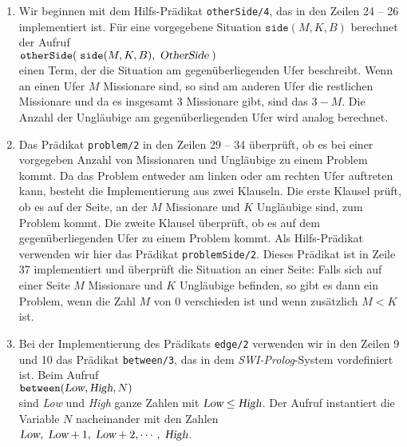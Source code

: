 \begin{enumerate}
\item Wir beginnen mit dem  Hilfs-Pr\"{a}dikat \texttt{otherSide/4}, das in den
      Zeilen 24 -- 26 implementiert ist.  F\"{u}r eine vorgegebene Situation
      $\texttt{side}(M,K,B)$ berechnet der Aufruf \\[0.1cm]
      \hspace*{1.3cm} $\texttt{otherSide}(\; \texttt{side}(M, K, B),\; \textsl{OtherSide} \;)$
      \\[0.1cm] 
      einen Term, der die Situation am gegen\"{u}berliegenden Ufer beschreibt.
      Wenn an einen Ufer $M$ Missionare sind, so sind am anderen Ufer die restlichen
      Missionare und da es insgesamt $3$ Missionare gibt, sind das $3 - M$.
      Die Anzahl der Ungl\"{a}ubige am gegen\"{u}berliegenden Ufer wird analog berechnet. 
\item Das Pr\"{a}dikat \texttt{problem/2} in den Zeilen 29 -- 34 \"{u}berpr\"{u}ft, ob es bei einer vorgegeben
      Anzahl von Missionaren und Ungl\"{a}ubige zu einem Problem kommt.
      Da das Problem entweder am linken oder am rechten Ufer auftreten kann,
      besteht die Implementierung aus zwei Klauseln.  Die erste Klausel pr\"{u}ft,
      ob es auf der Seite, an der $M$ Missionare und $K$ Ungl\"{a}ubige sind, zum Problem
      kommt.  Die zweite Klausel \"{u}berpr\"{u}ft, ob es auf dem gegen\"{u}berliegenden
      Ufer zu einem Problem kommt.  Als Hilfs-Pr\"{a}dikat verwenden wir hier das Pr\"{a}dikat
      \texttt{problemSide/2}.  Dieses Pr\"{a}dikat ist in Zeile 37 implementiert
      und \"{u}berpr\"{u}ft die Situation an einer Seite:  Falls sich auf einer Seite $M$ Missionare
      und $K$ Ungl\"{a}ubige befinden, so gibt es dann ein Problem, wenn die Zahl $M$ von 0
      verschieden ist und wenn zus\"{a}tzlich $M < K$ ist.
\item Bei der Implementierung des Pr\"{a}dikats \texttt{edge/2} verwenden wir in den Zeilen 9
      und 10 das Pr\"{a}dikat \texttt{between/3}, das in dem \textsl{SWI-Prolog}-System 
      vordefiniert ist.  Beim Aufruf \\[0.1cm]
      \hspace*{1.3cm} $\texttt{between}(\textsl{Low}, \textsl{High}, N)$ \\[0.1cm]
      sind \textsl{Low} und \textsl{High} ganze Zahlen mit $\textsl{Low} \leq \textsl{High}$.
      Der Aufruf instantiert die Variable $N$ nacheinander mit den Zahlen \\[0.1cm]
      \hspace*{1.3cm} $\textsl{Low},\; \textsl{Low}+1,\; \textsl{Low}+2, \cdots, \;\textsl{High}$. \\[0.1cm]

\end{enumerate}
